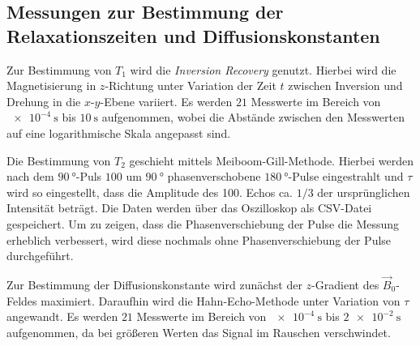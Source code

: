 \subsection{Messungen zur Bestimmung der Relaxationszeiten und Diffusionskonstanten}

Zur Bestimmung von $T_1$ wird die \textit{Inversion Recovery} genutzt. Hierbei wird die Magnetisierung in $z$-Richtung unter Variation der Zeit $t$ zwischen Inversion und Drehung in die $x$-$y$-Ebene variiert. Es werden $21$ Messwerte im Bereich von $\SI{e-4}{\second}$ bis $\SI{10}{\second}$ aufgenommen, wobei die Abstände zwischen den Messwerten auf eine logarithmische Skala angepasst sind.

Die Bestimmung von $T_2$ geschieht mittels Meiboom-Gill-Methode. Hierbei werden nach dem $\SI{90}{\degree}$-Puls $100$ um $\SI{90}{\degree}$ phasenverschobene $\SI{180}{\degree}$-Pulse eingestrahlt und $\tau$ wird so eingestellt, dass die Amplitude des 100. Echos ca. $1/3$ der ursprünglichen Intensität beträgt. Die Daten werden über das Oszilloskop als CSV-Datei gespeichert. Um zu zeigen, dass die Phasenverschiebung der Pulse die Messung erheblich verbessert, wird diese nochmals ohne Phasenverschiebung der Pulse durchgeführt.

Zur Bestimmung der Diffusionskonstante wird zunächst der $z$-Gradient des $\vec{B}_0$-Feldes maximiert. Daraufhin wird die Hahn-Echo-Methode unter Variation von $\tau$ angewandt. Es werden $21$ Messwerte im Bereich von $\SI{e-4}{\second}$ bis $\SI{2e-2}{\second}$ aufgenommen, da bei größeren Werten das Signal im Rauschen verschwindet.
